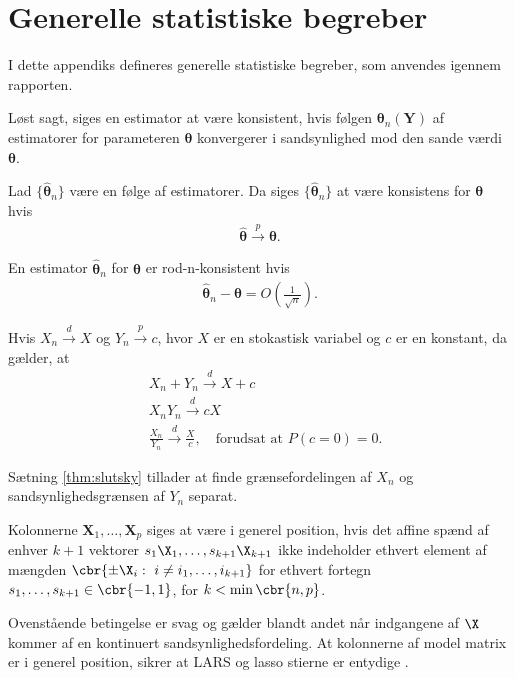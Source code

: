 \chapter{Generelle statistiske begreber}
I dette appendiks defineres generelle statistiske begreber, som anvendes igennem rapporten.

Løst sagt, siges en estimator at være konsistent, hvis følgen $\boldsymbol{\theta}_n(\mathbf{Y})$ af estimatorer for parameteren $\boldsymbol{\theta}$ konvergerer i sandsynlighed mod den sande værdi $\boldsymbol{\theta}$. 
% 
\begin{defn} \label{def:konsistent}
Lad $\{ \boldsymbol{\hat{\theta}}_n \}$ være en følge af estimatorer. Da siges $ \{ \boldsymbol {\hat{\theta}}_n \}$ at være konsistens for $\boldsymbol{\theta}$ hvis
\begin{align*}
\boldsymbol{\hat{\theta}} \overset{p}{\rightarrow} \boldsymbol{\theta}.
\end{align*}
\end{defn}
%
\begin{defn} \label{def:rodn}
En estimator $  \boldsymbol {\hat{\theta}}_n $ for $\boldsymbol{\theta}$ er rod-n-konsistent hvis
\begin{align*}
\boldsymbol {\hat{\theta}}_n  - \boldsymbol{\theta} = O \left( \frac{1}{\sqrt{n}} \right).
\end{align*}
\end{defn}

\begin{thm} \label{thm:slutsky}
Hvis $X_n \overset{d}{\rightarrow} X$ og $Y_n \overset{p}{\rightarrow} c$, hvor $X$ er en stokastisk variabel og $c$ er en konstant, da gælder, at
\begin{align*}
& X_n + Y_n \overset{d}{\rightarrow} X+c \\
& X_n Y_n \overset{d}{\rightarrow} cX \\
& \frac{X_n}{Y_n} \overset{d}{\rightarrow} \frac{X}{c}, \quad \text{forudsat at } P(c=0)=0.
\end{align*}
\end{thm}
Sætning \ref{thm:slutsky} tillader at finde grænsefordelingen af $X_n$ og sandsynlighedsgrænsen af $Y_n$ separat.


\begin{defn} \label{defn:general_position}
Kolonnerne \(\mathbf{X}_1, \ldots, \mathbf{X}_p\) siges at være i generel position, hvis det affine spænd af enhver \(k+1\) vektorer \(s_1 \X_1, \ldots, s_{k+1} \X_{k+1}\) ikke indeholder ethvert element af mængden \(\cbr{\pm \X_i : \ i \neq i_1, \ldots, i_{k+1}}\) for ethvert fortegn \(s_1, \ldots, s_{k+1} \in \cbr{-1,1}\), for \(k < \min \cbr{n,p}\). 
\end{defn}
Ovenstående betingelse er svag og gælder blandt andet når indgangene af \(\X\) kommer af en kontinuert sandsynlighedsfordeling.
At kolonnerne af model matrix er i generel position, sikrer at LARS og lasso stierne er entydige \citep{lasso_unique}.

